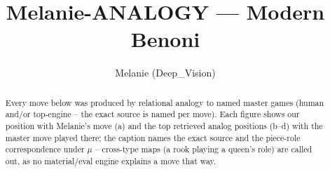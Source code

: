 \documentclass[11pt]{article}
\title{Melanie-ANALOGY — Modern Benoni}
\author{Melanie (Deep\_Vision)}
\date{}
\begin{document}
\maketitle

\begin{abstract}Every move below was produced by relational analogy to named master games (human and/or top-engine -- the exact source is named per move). Each figure shows our position with Melanie's move (a) and the top retrieved analog positions (b--d) with the master move played there; the caption names the exact source and the piece-role correspondence under $\mu$ -- cross-type maps (a rook playing a queen's role) are called out, as no material/eval engine explains a move that way.\end{abstract}

\begin{figure}[p]\centering
\begin{subfigure}{0.46\textwidth}\centering
\resizebox{\linewidth}{!}{%
\newchessgame
\chessboard[
  setfen={rnbqkb1r/pp3p1p/3p1np1/2pP4/4P3/2N5/PP3PPP/R1BQKBNR w KQkq - 0 7},
  showmover=false,
  pgfstyle=straightmove, color=movearrow, markmove={c1-e3}
]}
\caption{}
\end{subfigure}\hfill
\begin{subfigure}{0.46\textwidth}\centering
\resizebox{\linewidth}{!}{%
\newchessgame
\chessboard[
  setfen={rnbqkb1r/pp3p1p/3p1np1/2pP4/4P3/2N5/PP3PPP/R1BQKBNR w KQkq - 0 7},
  showmover=false,
  pgfstyle=straightmove, color=movearrow, markmove={g1-f3}
]}
\caption{}
\end{subfigure}
\\[4pt]
\begin{subfigure}{0.46\textwidth}\centering
\resizebox{\linewidth}{!}{%
\newchessgame
\chessboard[
  setfen={rnbqkb1r/pp3p1p/3p1np1/2pP4/4P3/2N5/PP3PPP/R1BQKBNR w KQkq - 0 7},
  showmover=false,
  pgfstyle=straightmove, color=movearrow, markmove={g1-f3}
]}
\caption{}
\end{subfigure}\hfill
\begin{subfigure}{0.46\textwidth}\centering
\resizebox{\linewidth}{!}{%
\newchessgame
\chessboard[
  setfen={rnbqkb1r/pp3p1p/3p1np1/2pP4/4P3/2N5/PP3PPP/R1BQKBNR w KQkq - 0 7},
  showmover=false,
  pgfstyle=straightmove, color=movearrow, markmove={g1-f3}
]}
\caption{}
\end{subfigure}

\end{figure}
\end{document}
